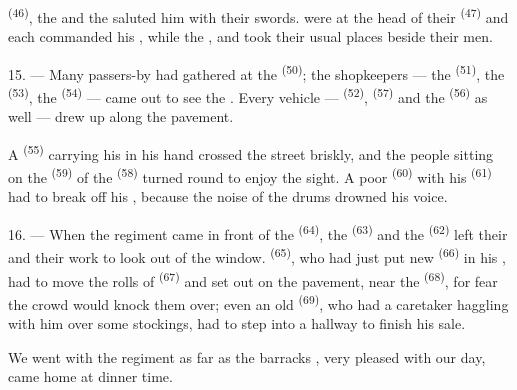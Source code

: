  \textsuperscript{(46)}, the  and the
 saluted him with their swords.
 were at the head of their 
\textsuperscript{(47)} and each  commanded his , while the
,  and
 took their usual places beside their
men.

15. --- Many passers-by had gathered at the  \textsuperscript{(50)}; the
shopkeepers --- the  \textsuperscript{(51)}, the 
\textsuperscript{(53)}, the  \textsuperscript{(54)} --- came out to see the
. Every vehicle ---  \textsuperscript{(52)},
 \textsuperscript{(57)} and the 
\textsuperscript{(56)} as well --- drew up along the pavement.

\VUsaut{3.0mm}

A  \textsuperscript{(55)} carrying his
 in his hand crossed the street briskly, and the people
sitting on the  \textsuperscript{(59)} of the 
\textsuperscript{(58)} turned round to enjoy the sight. A poor
 \textsuperscript{(60)} with his  \textsuperscript{(61)}
had to break off his , because the noise of the drums drowned his voice.

16. --- When the regiment came in front of the  \textsuperscript{(64)},
the  \textsuperscript{(63)} and the
 \textsuperscript{(62)} left their  and their
work to look out of the window.  \textsuperscript{(65)}, who had just
put new  \textsuperscript{(66)} in his , had to move the
rolls of  \textsuperscript{(67)} and  set out on the pavement,
near the  \textsuperscript{(68)}, for fear the crowd would knock them
over; even an old  \textsuperscript{(69)}, who had a caretaker haggling with
him over some stockings, had to step into a hallway to finish his sale.

We went with the regiment as far as the barracks , very pleased with our day, came
home at dinner time.


